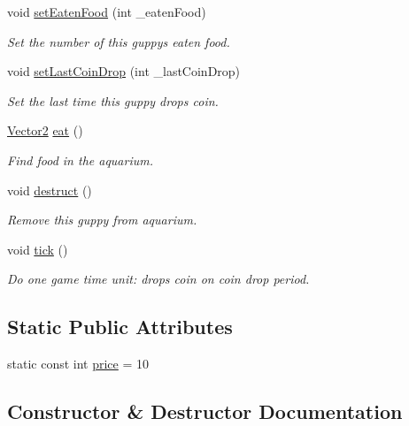 \begin{DoxyCompactItemize}
void \mbox{\hyperlink{class_guppy_a718281abaf31796884adfe861ca8b491}{set\+Eaten\+Food}} (int \+\_\+eaten\+Food)
\begin{DoxyCompactList}\small\item\em Set the number of this guppy\textquotesingle{}s eaten food. \end{DoxyCompactList}\item 
void \mbox{\hyperlink{class_guppy_a39d8082e478435982f05baa6e64b0901}{set\+Last\+Coin\+Drop}} (int \+\_\+last\+Coin\+Drop)
\begin{DoxyCompactList}\small\item\em Set the last time this guppy drops coin. \end{DoxyCompactList}\item 
\mbox{\hyperlink{struct_vector2}{Vector2}} \mbox{\hyperlink{class_guppy_aaeab888b423fd0ea3cc911b974b04f48}{eat}} ()
\begin{DoxyCompactList}\small\item\em Find food in the aquarium. \end{DoxyCompactList}\item 
void \mbox{\hyperlink{class_guppy_a26bc11223497fef2ae795283a5682407}{destruct}} ()
\begin{DoxyCompactList}\small\item\em Remove this guppy from aquarium. \end{DoxyCompactList}\item 
void \mbox{\hyperlink{class_guppy_ab2f219fa29b0d22ee9702a55fede519b}{tick}} ()
\begin{DoxyCompactList}\small\item\em Do one game time unit\+: drops coin on coin drop period. \end{DoxyCompactList}\end{DoxyCompactItemize}
\subsection*{Static Public Attributes}
\begin{DoxyCompactItemize}
\item 
static const int \mbox{\hyperlink{class_guppy_ab0e5429cdfa8dfaafd56422fe35de0c7}{price}} = 10
\end{DoxyCompactItemize}


\subsection{Constructor \& Destructor Documentation}
\mbox{\label{class_guppy_a6759d8e672846fcabdfee3df44e06275}} 
